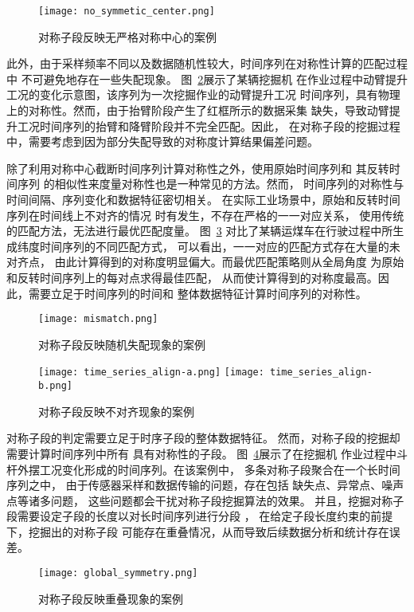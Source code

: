\begin{figure}
  \centering
  \texttt{[image: no\_symmetic\_center.png]}
  \caption{对称子段反映无严格对称中心的案例}
  \label{fig:no_symmetic_center}
\end{figure}

此外，由于采样频率不同以及数据随机性较大，时间序列在对称性计算的匹配过程中
不可避免地存在一些失配现象\cite{DBLP:journals/corr/abs-2202-05403}。
图~\ref{fig:mismatch}展示了某辆挖掘机
在作业过程中动臂提升工况的变化示意图，该序列为一次挖掘作业的动臂提升工况
时间序列，具有物理上的对称性。然而，由于抬臂阶段产生了红框所示的数据采集
缺失，导致动臂提升工况时间序列的抬臂和降臂阶段并不完全匹配。因此，
在对称子段的挖掘过程中，需要考虑到因为部分失配导致的对称度计算结果偏差问题。

除了利用对称中心截断时间序列计算对称性之外，使用原始时间序列和
其反转时间序列\cite{DBLP:journals/entropy/ChvostekovaJK21}
的相似性来度量对称性也是一种常见的方法。然而，
时间序列的对称性与时间间隔、序列变化和数据特征密切相关。
在实际工业场景中，原始和反转时间序列在时间线上不对齐的情况
时有发生，不存在严格的一一对应关系，
使用传统的匹配方法，无法进行最优匹配度量。
图~\ref{fig:time_series_align}
对比了某辆运煤车在行驶过程中所生成纬度时间序列的不同匹配方式，
可以看出，一一对应的匹配方式存在大量的未对齐点，
由此计算得到的对称度明显偏大。而最优匹配策略则从全局角度
为原始和反转时间序列上的每对点求得最佳匹配，
从而使计算得到的对称度最高。因此，需要立足于时间序列的时间和
整体数据特征计算时间序列的对称性。

\begin{figure}
  \centering
  \texttt{[image: mismatch.png]}
  \caption{对称子段反映随机失配现象的案例}
  \label{fig:mismatch}
\end{figure}
\begin{figure}
  \centering
    {\texttt{[image: time\_series\_align-a.png]}}
    {\texttt{[image: time\_series\_align-b.png]}}
  \caption{对称子段反映不对齐现象的案例}
  \label{fig:time_series_align}
\end{figure}

对称子段的判定需要立足于时序子段的整体数据特征。
然而，对称子段的挖掘却需要计算时间序列中所有
具有对称性的子段。
图~\ref{fig:segement_symmetric_pattern}展示了在挖掘机
作业过程中斗杆外摆工况变化形成的时间序列。在该案例中，
多条对称子段聚合在一个长时间序列之中，
由于传感器采样和数据传输的问题，存在包括
缺失点、异常点、噪声点等诸多问题\cite{DBLP:conf/sigmod/SongZWY15}，
这些问题都会干扰对称子段挖掘算法的效果。
并且，挖掘对称子段需要设定子段的长度以对长时间序列进行分段
\cite{DBLP:journals/tist/MuralidharTCCRP20}，
在给定子段长度约束的前提下，挖掘出的对称子段
可能存在重叠情况，从而导致后续数据分析和统计存在误差。
\begin{figure}
  \centering
  \texttt{[image: global\_symmetry.png]}
  \caption{对称子段反映重叠现象的案例}
  \label{fig:segement_symmetric_pattern}
\end{figure}


